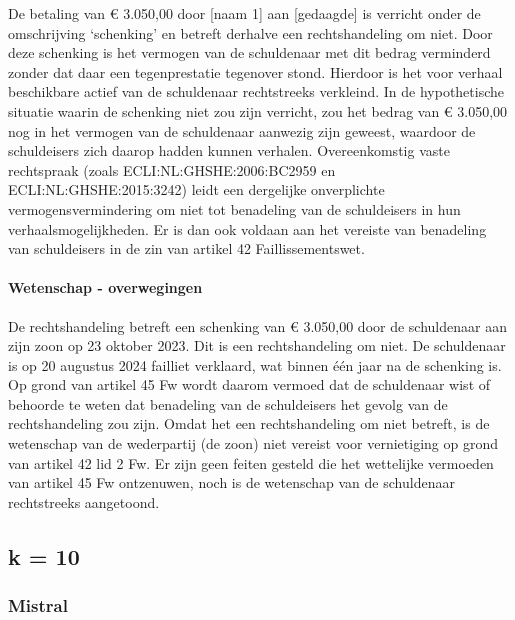 \documentclass[
  dutch,
  a4paper,
]{article}
\begin{document}
De betaling van € 3.050,00 door {[}naam 1{]} aan {[}gedaagde{]} is verricht onder de omschrijving `schenking' en betreft derhalve een rechtshandeling om niet. Door deze schenking is het vermogen van de schuldenaar met dit bedrag verminderd zonder dat daar een tegenprestatie tegenover stond. Hierdoor is het voor verhaal beschikbare actief van de schuldenaar rechtstreeks verkleind. In de hypothetische situatie waarin de schenking niet zou zijn verricht, zou het bedrag van € 3.050,00 nog in het vermogen van de schuldenaar aanwezig zijn geweest, waardoor de schuldeisers zich daarop hadden kunnen verhalen. Overeenkomstig vaste rechtspraak (zoals ECLI:NL:GHSHE:2006:BC2959 en ECLI:NL:GHSHE:2015:3242) leidt een dergelijke onverplichte vermogensvermindering om niet tot benadeling van de schuldeisers in hun verhaalsmogelijkheden. Er is dan ook voldaan aan het vereiste van benadeling van schuldeisers in de zin van artikel 42 Faillissementswet.

\paragraph{Wetenschap - overwegingen}\label{wetenschap---overwegingen-32}

De rechtshandeling betreft een schenking van € 3.050,00 door de schuldenaar aan zijn zoon op 23 oktober 2023. Dit is een rechtshandeling om niet. De schuldenaar is op 20 augustus 2024 failliet verklaard, wat binnen één jaar na de schenking is. Op grond van artikel 45 Fw wordt daarom vermoed dat de schuldenaar wist of behoorde te weten dat benadeling van de schuldeisers het gevolg van de rechtshandeling zou zijn. Omdat het een rechtshandeling om niet betreft, is de wetenschap van de wederpartij (de zoon) niet vereist voor vernietiging op grond van artikel 42 lid 2 Fw. Er zijn geen feiten gesteld die het wettelijke vermoeden van artikel 45 Fw ontzenuwen, noch is de wetenschap van de schuldenaar rechtstreeks aangetoond.

\newpage


\subsection{k = 10}\label{k-10-3}

\subsubsection{Mistral}\label{mistral-11}
\end{document}
